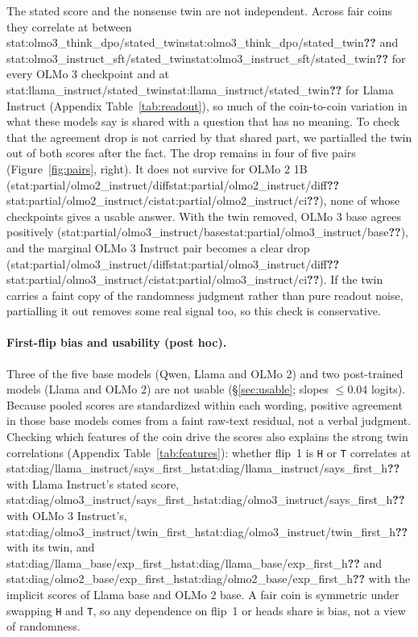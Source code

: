 \documentclass[11pt]{article}
\newcommand{\stat}[1]{\ifcsname stat:#1\endcsname\csname stat:#1\endcsname\else\textbf{??}\fi}
\begin{document}
The stated score and the nonsense twin are not independent. Across fair coins they correlate at between \stat{olmo3_think_dpo/stated_twin} and \stat{olmo3_instruct_sft/stated_twin} for every OLMo 3 checkpoint and at \stat{llama_instruct/stated_twin} for Llama Instruct (Appendix Table~\ref{tab:readout}), so much of the coin-to-coin variation in what these models say is shared with a question that has no meaning. To check that the agreement drop is not carried by that shared part, we partialled the twin out of both scores after the fact. The drop remains in four of five pairs (Figure~\ref{fig:pairs}, right). It does not survive for OLMo 2 1B (\stat{partial/olmo2_instruct/diff} \stat{partial/olmo2_instruct/ci}), none of whose checkpoints gives a usable answer. With the twin removed, OLMo 3 base agrees positively (\stat{partial/olmo3_instruct/base}), and the marginal OLMo 3 Instruct pair becomes a clear drop (\stat{partial/olmo3_instruct/diff} \stat{partial/olmo3_instruct/ci}). If the twin carries a faint copy of the randomness judgment rather than pure readout noise, partialling it out removes some real signal too, so this check is conservative.

\paragraph{First-flip bias and usability (post hoc).} Three of the five base models (Qwen, Llama and OLMo 2) and two post-trained models (Llama and OLMo 2) are not usable (\S\ref{sec:usable}; slopes $\leq 0.04$ logits). Because pooled scores are standardized within each wording, positive agreement in those base models comes from a faint raw-text residual, not a verbal judgment. Checking which features of the coin drive the scores also explains the strong twin correlations (Appendix Table~\ref{tab:features}): whether flip~1 is \texttt{H} or \texttt{T} correlates at \stat{diag/llama_instruct/says_first_h} with Llama Instruct's stated score, \stat{diag/olmo3_instruct/says_first_h} with OLMo 3 Instruct's, \stat{diag/olmo3_instruct/twin_first_h} with its twin, and \stat{diag/llama_base/exp_first_h} and \stat{diag/olmo2_base/exp_first_h} with the implicit scores of Llama base and OLMo 2 base. A fair coin is symmetric under swapping \texttt{H} and \texttt{T}, so any dependence on flip~1 or heads share is bias, not a view of randomness.
\end{document}
